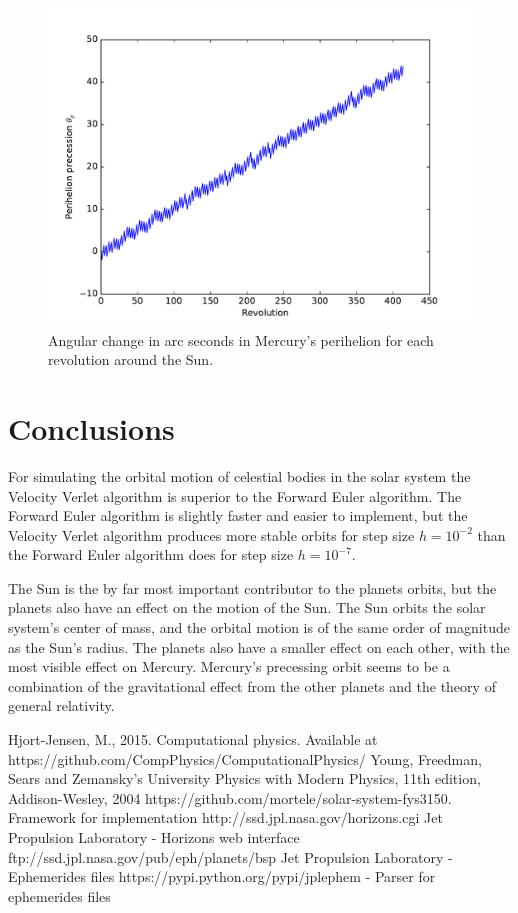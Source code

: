 \documentclass{article}
\begin{document}
\begin{figure}
\centering
\includegraphics[width=0.8\linewidth]{fig/Perihelion_Precession.pdf}
\caption{Angular change in arc seconds in Mercury's perihelion for each revolution around the Sun.}
\label{fig:peri}
\end{figure}

\section{Conclusions}
\label{sec:conclusions}
For simulating the orbital motion of celestial bodies in the solar system the Velocity Verlet algorithm is superior to the Forward Euler algorithm. The Forward Euler algorithm is slightly faster and easier to implement, but the Velocity Verlet algorithm produces more stable orbits for step size $h=10^{-2}$ than the Forward Euler algorithm does for step size $h=10^{-7}$.

The Sun is the by far most important contributor to the planets orbits, but the planets also have an effect on the motion of the Sun. The Sun orbits the solar system's center of mass, and the orbital motion is of the same order of magnitude as the Sun's radius. The planets also have a smaller effect on each other, with the most visible effect on Mercury. Mercury's precessing orbit seems to be a combination of the gravitational effect from the other planets and the theory of general relativity.


\clearpage

\begin{thebibliography}{1}
 Hjort-Jensen, M., 2015. Computational physics. Available at https://github.com/CompPhysics/ComputationalPhysics/
 Young, Freedman, Sears and Zemansky's University Physics with Modern Physics, 11th edition, Addison-Wesley, 2004  
 https://github.com/mortele/solar-system-fys3150. Framework for implementation
 http://ssd.jpl.nasa.gov/horizons.cgi Jet Propulsion Laboratory - Horizons web interface
 ftp://ssd.jpl.nasa.gov/pub/eph/planets/bsp Jet Propulsion Laboratory - Ephemerides files
 https://pypi.python.org/pypi/jplephem - Parser for ephemerides files
\end{thebibliography}
\end{document}
